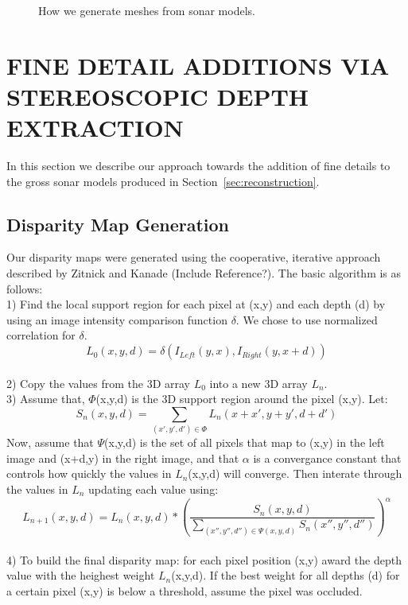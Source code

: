 \documentclass[a4paper,twoside]{article}
\begin{document}
\begin{figure*}[!ht]
   \vspace{-0.2cm}
   \caption{How we generate meshes from sonar models.}
  \label{fig:meshgen}
 \end{figure*}

\section{\uppercase{Fine Detail Additions Via Stereoscopic Depth Extraction}}
\label{sec:detail}

\noindent In this section we describe our approach towards the addition of fine details to the gross sonar models produced in Section~\ref{sec:reconstruction}. 


\subsection{Disparity Map Generation}
Our disparity maps were generated using the cooperative, iterative approach described by Zitnick and Kanade (Include Reference?).  
The basic algorithm is as follows:
\\ 1) Find the local support region for each pixel at (x,y) and each depth (d) by using an image intensity comparison function \(\delta\).  We chose to use normalized correlation for \(\delta\).
\[L_0(x,y,d) = \delta(I_{Left}(y,x),I_{Right}(y,x+d))\]
\\ 2) Copy the values from the 3D array \(L_0\) into a new 3D array \(L_n\).
\\ 3) Assume that, \(\Phi\)(x,y,d) is the 3D support region around the pixel (x,y).
Let: \[S_n(x,y,d) = \sum_{(x',y',d') \in \Phi} L_n (x+x', y+y', d+d') \]
Now, assume that \(\Psi\)(x,y,d) is the set of all pixels that map to (x,y) in the left image and (x+d,y) in the right image, and that \(\alpha\) is a convergance constant that controls how quickly the values in \(L_n\)(x,y,d) will converge.  
Then interate through the values in \(L_n\) updating each value using: 
\[L_{n+1}(x,y,d) = L_n(x,y,d)*\left(  \frac{S_n(x,y,d)}{\sum_{(x'',y'',d'') \in \Psi(x,y,d)} S_n(x'',y'',d'')} \right)^\alpha \]
\\ 4) To build the final disparity map: for each pixel position (x,y) award the depth value with the heighest weight \(L_n\)(x,y,d).  If the best weight for all depths (d) for a certain pixel (x,y) is below a threshold, assume the pixel was occluded.
\end{document}
